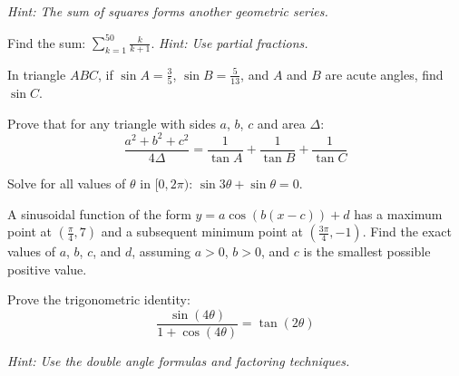 \documentclass[12pt]{exam}
\begin{document}
\begin{questions}
\textit{Hint: The sum of squares forms another geometric series.}
\vspace*{6cm}

\question[8]
Find the sum: $\sum_{k=1}^{50} \frac{k}{k+1}$.
\textit{Hint: Use partial fractions.}

\vspace*{6cm}


\question[8]
In triangle $ABC$, if $\sin A = \frac{3}{5}$, $\sin B = \frac{5}{13}$, and $A$ and $B$ are acute angles, find $\sin C$.
\vspace*{6cm}

\question[9]
Prove that for any triangle with sides $a$, $b$, $c$ and area $\Delta$:
\[ \frac{a^2 + b^2 + c^2}{4\Delta} = \frac{1}{\tan A} + \frac{1}{\tan B} + \frac{1}{\tan C} \]
\vspace*{7cm}

\question[8]
Solve for all values of $\theta$ in $[0, 2\pi)$: $\sin 3\theta + \sin \theta = 0$.
\vspace*{6cm}


\question[9]
A sinusoidal function of the form $y = a \cos(b(x-c)) + d$ has a maximum point at $(\frac{\pi}{4}, 7)$ and a subsequent minimum point at $(\frac{3\pi}{4}, -1)$. Find the exact values of $a$, $b$, $c$, and $d$, assuming $a > 0$, $b > 0$, and $c$ is the smallest possible positive value.
\vspace*{6cm}

\newpage

\question[10]
Prove the trigonometric identity:
\[ \frac{\sin(4\theta)}{1 + \cos(4\theta)} = \tan(2\theta) \]

\textit{Hint: Use the double angle formulas and factoring techniques.}
\vspace*{7cm}

\end{questions}
\end{document}
